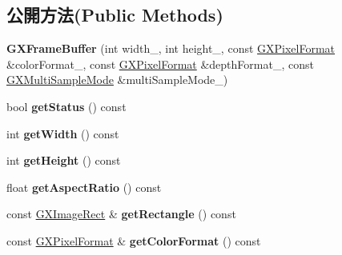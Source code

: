 \subsection*{公開方法(Public Methods)}
\begin{DoxyCompactItemize}
\item 
{\bfseries G\+X\+Frame\+Buffer} (int width\+\_\+, int height\+\_\+, const \hyperlink{class_magnum_1_1_g_x_pixel_format}{G\+X\+Pixel\+Format} \&color\+Format\+\_\+, const \hyperlink{class_magnum_1_1_g_x_pixel_format}{G\+X\+Pixel\+Format} \&depth\+Format\+\_\+, const \hyperlink{class_magnum_1_1_g_x_multi_sample_mode}{G\+X\+Multi\+Sample\+Mode} \&multi\+Sample\+Mode\+\_\+)\hypertarget{class_magnum_1_1_g_x_frame_buffer_acb61f41cbf2d42b472297855c5e27864}{}\label{class_magnum_1_1_g_x_frame_buffer_acb61f41cbf2d42b472297855c5e27864}

\item 
bool {\bfseries get\+Status} () const \hypertarget{class_magnum_1_1_g_x_frame_buffer_ac0d60c1b4fb49ffe0f7c4f39e12761de}{}\label{class_magnum_1_1_g_x_frame_buffer_ac0d60c1b4fb49ffe0f7c4f39e12761de}

\item 
int {\bfseries get\+Width} () const \hypertarget{class_magnum_1_1_g_x_frame_buffer_a21840149b3c41272575c9bfbd2a26729}{}\label{class_magnum_1_1_g_x_frame_buffer_a21840149b3c41272575c9bfbd2a26729}

\item 
int {\bfseries get\+Height} () const \hypertarget{class_magnum_1_1_g_x_frame_buffer_a2bfffe90157333e6f22957ab31fb2ec7}{}\label{class_magnum_1_1_g_x_frame_buffer_a2bfffe90157333e6f22957ab31fb2ec7}

\item 
float {\bfseries get\+Aspect\+Ratio} () const \hypertarget{class_magnum_1_1_g_x_frame_buffer_acb651206223853b9e7f1fc8ec822026a}{}\label{class_magnum_1_1_g_x_frame_buffer_acb651206223853b9e7f1fc8ec822026a}

\item 
const \hyperlink{class_magnum_1_1_g_x_image_rect}{G\+X\+Image\+Rect} \& {\bfseries get\+Rectangle} () const \hypertarget{class_magnum_1_1_g_x_frame_buffer_ad6ad7530d98480a09f5bea5cde11f24e}{}\label{class_magnum_1_1_g_x_frame_buffer_ad6ad7530d98480a09f5bea5cde11f24e}

\item 
const \hyperlink{class_magnum_1_1_g_x_pixel_format}{G\+X\+Pixel\+Format} \& {\bfseries get\+Color\+Format} () const \hypertarget{class_magnum_1_1_g_x_frame_buffer_a4e40d145996cb4f6d30fe7b9bdc5495a}{}\label{class_magnum_1_1_g_x_frame_buffer_a4e40d145996cb4f6d30fe7b9bdc5495a}


\end{DoxyCompactItemize}
